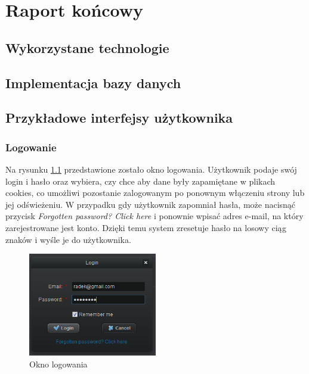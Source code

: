 \chapter{Raport końcowy}
\label{cha:raport}

\section{Wykorzystane technologie}
\label{sec:technologie}



\section{Implementacja bazy danych}
\label{sec:impldb}



\section{Przykładowe interfejsy użytkownika}
\label{sec:interfejsy}

\subsection{Logowanie}
\label{sec:login}
Na rysunku \ref{fig:login} przedstawione zostało okno logowania. Użytkownik podaje swój login i hasło oraz wybiera, czy chce aby dane były zapamiętane w plikach cookies, co umożliwi pozostanie zalogowanym po ponownym włączeniu strony lub jej odświeżeniu. W przypadku gdy użytkownik zapomniał hasła, może nacisnąć przycisk \emph{Forgotten password? Click here} i ponownie wpisać adres e-mail, na który zarejestrowane jest konto. Dzięki temu system zresetuje hasło na losowy ciąg znaków i wyśle je do użytkownika.

\begin{figure}[h!]	
\centering
\includegraphics[width=0.5\textwidth]{./img/interfejsy/login2}
\caption{Okno logowania}
\label{fig:login}
\end{figure}

